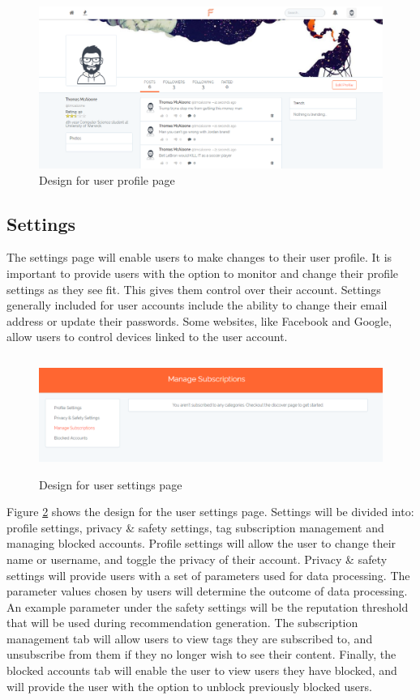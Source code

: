 \begin{figure}[H]
\centering
\includegraphics[width=\linewidth]{Images/Design/user_profile}
\caption{Design for user profile page}
\label{fig:user_profile}
\end{figure}

\subsection{Settings}
The settings page will enable users to make changes to their user profile. It is important to provide users with the option to monitor and change their profile settings as they see fit. This gives them control over their account. Settings generally included for user accounts include the ability to change their email address or update their passwords. Some websites, like Facebook and Google, allow users to control devices linked to the user account.

\begin{figure}[H]
\centering
\includegraphics[height=1.5in]{Images/Design/SettingsPage}
\caption{Design for user settings page}
\label{fig:SettingsPage}
\end{figure}

Figure \ref{fig:SettingsPage} shows the design for the user settings page. Settings will be divided into: profile settings, privacy \& safety settings, tag subscription management and managing blocked accounts. Profile settings will allow the user to change their name or username, and toggle the privacy of their account. Privacy \& safety settings will provide users with a set of parameters used for data processing. The parameter values chosen by users will determine the outcome of data processing. An example parameter under the safety settings will be the reputation threshold that will be used during recommendation generation. The subscription management tab will allow users to view tags they are subscribed to, and unsubscribe from them if they no longer wish to see their content. Finally, the blocked accounts tab will enable the user to view users they have blocked, and will provide the user with the option to unblock previously blocked users.

